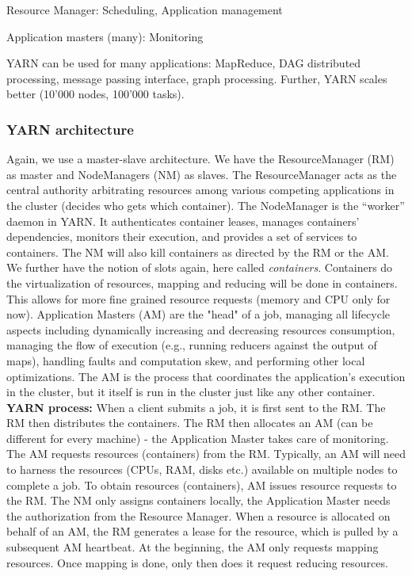 \documentclass[11pt,oneside,a4paper]{article}
\begin{document}
\begin{compactitem}
\item Resource Manager: Scheduling, Application management
\item Application masters (many): Monitoring
\end{compactitem}

YARN can be used for many applications: MapReduce, DAG distributed processing, message passing interface, graph processing. Further, YARN scales better (10'000 nodes, 100'000 tasks).


\subsubsection{YARN architecture}

Again, we use a master-slave architecture. We have the ResourceManager (RM) as master and NodeManagers (NM) as slaves. The ResourceManager acts as the central authority arbitrating resources among
various competing applications in the cluster (decides who gets which container). The NodeManager is the “worker” daemon in YARN. It authenticates container leases, manages containers’ dependencies, monitors their execution, and provides a set of services to containers. The NM will also kill containers as directed by the RM or the AM. We further have the notion of slots again, here called \textit{containers}. Containers do the virtualization of resources, mapping and reducing will be done in containers. This allows for more fine grained resource requests (memory and CPU only for now). Application Masters (AM) are the "head" of a job, managing all lifecycle aspects including dynamically increasing and decreasing resources consumption, managing the flow of execution (e.g., running reducers against the output of maps), handling faults and computation skew, and performing other local optimizations. The AM is the process that coordinates the application’s execution in the cluster, but it itself is run in the cluster just like any other container. \\

\textbf{YARN process:} When a client submits a job, it is first sent to the RM. The RM then distributes the containers. The RM then allocates an AM (can be different for every machine) - the Application Master takes care of monitoring. The AM requests resources (containers) from the RM. Typically, an AM will need to harness the resources (CPUs, RAM, disks etc.) available on multiple nodes to complete a job. To obtain resources (containers), AM issues resource requests to the RM.  The NM only assigns containers locally, the Application Master needs the authorization from the Resource Manager. When a resource is allocated on behalf of an AM, the RM generates a lease for the resource, which is pulled by a subsequent AM
heartbeat.  At the beginning, the AM only requests mapping resources. Once mapping is done, only then does it request reducing resources.
\end{document}
